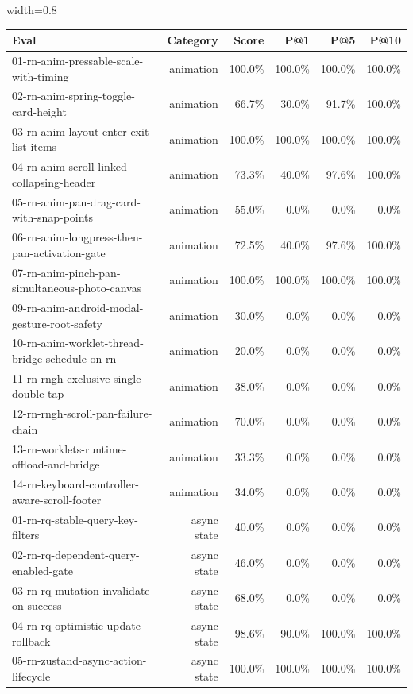 \begin{table}[htbp]
\centering
\begin{adjustbox}{width=0.8\textwidth}
\begin{tabular}{lrrrrr}
\toprule
Eval & Category & Score & P@1 & P@5 & P@10 \\
\midrule
01-rn-anim-pressable-scale-with-timing & animation & 100.0\% & 100.0\% & 100.0\% & 100.0\% \\
02-rn-anim-spring-toggle-card-height & animation & 66.7\% & 30.0\% & 91.7\% & 100.0\% \\
03-rn-anim-layout-enter-exit-list-items & animation & 100.0\% & 100.0\% & 100.0\% & 100.0\% \\
04-rn-anim-scroll-linked-collapsing-header & animation & 73.3\% & 40.0\% & 97.6\% & 100.0\% \\
05-rn-anim-pan-drag-card-with-snap-points & animation & 55.0\% & 0.0\% & 0.0\% & 0.0\% \\
06-rn-anim-longpress-then-pan-activation-gate & animation & 72.5\% & 40.0\% & 97.6\% & 100.0\% \\
07-rn-anim-pinch-pan-simultaneous-photo-canvas & animation & 100.0\% & 100.0\% & 100.0\% & 100.0\% \\
09-rn-anim-android-modal-gesture-root-safety & animation & 30.0\% & 0.0\% & 0.0\% & 0.0\% \\
10-rn-anim-worklet-thread-bridge-schedule-on-rn & animation & 20.0\% & 0.0\% & 0.0\% & 0.0\% \\
11-rn-rngh-exclusive-single-double-tap & animation & 38.0\% & 0.0\% & 0.0\% & 0.0\% \\
12-rn-rngh-scroll-pan-failure-chain & animation & 70.0\% & 0.0\% & 0.0\% & 0.0\% \\
13-rn-worklets-runtime-offload-and-bridge & animation & 33.3\% & 0.0\% & 0.0\% & 0.0\% \\
14-rn-keyboard-controller-aware-scroll-footer & animation & 34.0\% & 0.0\% & 0.0\% & 0.0\% \\
01-rn-rq-stable-query-key-filters & async state & 40.0\% & 0.0\% & 0.0\% & 0.0\% \\
02-rn-rq-dependent-query-enabled-gate & async state & 46.0\% & 0.0\% & 0.0\% & 0.0\% \\
03-rn-rq-mutation-invalidate-on-success & async state & 68.0\% & 0.0\% & 0.0\% & 0.0\% \\
04-rn-rq-optimistic-update-rollback & async state & 98.6\% & 90.0\% & 100.0\% & 100.0\% \\
05-rn-zustand-async-action-lifecycle & async state & 100.0\% & 100.0\% & 100.0\% & 100.0\% \\

\end{tabular}
\end{adjustbox}
\end{table}
